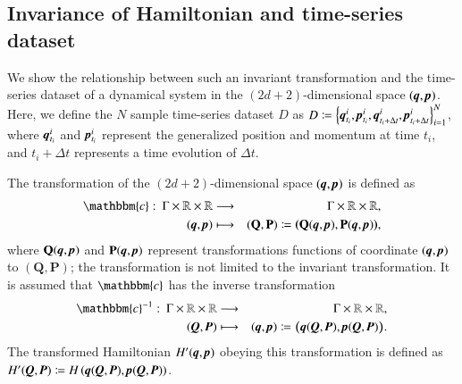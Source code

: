 \documentclass[preprint,
bibnotes,
 amsmath,amssymb,
 aps,
]{revtex4-1}
\begin{document}
\subsection{Invariance of Hamiltonian and time-series dataset}
We show the relationship between such an invariant transformation and 
the time-series dataset of a dynamical system in the $(2d+2)$-dimensional space $(\textit{\textbf{q}},\textit{\textbf{p}})$. 
Here, we define the $N$ sample time-series dataset $D$ as $D \coloneqq \left\{\textit{\textbf{q}}_{t_i}^i, \textit{\textbf{p}}_{t_i}^i,\textit{\textbf{q}}_{t_i+\Delta t}^i, \textit{\textbf{p}}_{t_i+\Delta t}^i\right\}_{i=1}^N$, where $\textit{\textbf{q}}_{t_i}^i$ and  $\textit{\textbf{p}}_{t_i}^i$ represent the generalized position and momentum at time $t_i$, and $t_i + \Delta t$ represents a time evolution of $\Delta t$.\par
The transformation of the $(2d+2)$-dimensional space $(\textit{\textbf{q}},\textit{\textbf{p}})$ is defined as  
\begin{eqnarray}
\label{transeq}
\mathbbm{c}:\: \Gamma \times \mathbb{R} \times \mathbb{R} &\longrightarrow& \Gamma \times \mathbb{R} \times \mathbb{R},\\ 
\:(\textit{\textbf{q}},\textit{\textbf{p}}) &\longmapsto& (\mathbf{Q},\mathbf{P}) \coloneqq \textbf{(}\mathbf{Q}(\textit{\textbf{q}},\textit{\textbf{p}}),\mathbf{P}(\textit{\textbf{q}},\textit{\textbf{p}})\textbf{)},
\end{eqnarray}
where $\mathbf{Q}(\textit{\textbf{q}},\textit{\textbf{p}})$ and $\mathbf{P}(\textit{\textbf{q}},\textit{\textbf{p}})$ represent transformations functions of coordinate $(\textit{\textbf{q}},\textit{\textbf{p}})$ to $(\mathbf{Q},\mathbf{P})$; the transformation is not limited to the invariant transformation. 
It is assumed that $\mathbbm{c}$ has the inverse transformation
\begin{eqnarray}
\mathbbm{c}^{-1}:\: \Gamma \times \mathbb{R} \times \mathbb{R} &\longrightarrow& \Gamma \times \mathbb{R} \times \mathbb{R},\\
\:(\textit{\textbf{Q}},\textit{\textbf{P}}) &\longmapsto& (\textit{\textbf{q}},\textit{\textbf{p}}) \coloneqq \boldsymbol{(}\textit{\textbf{q}}(\textit{\textbf{Q}},\textit{\textbf{P}}),\textit{\textbf{p}}(\textit{\textbf{Q}},\textit{\textbf{P}})\boldsymbol{)}.
\end{eqnarray}
The transformed Hamiltonian $H'(\textit{\textbf{q}},\textit{\textbf{p}})$ obeying this transformation is defined as $H'(\textit{\textbf{Q}},\textit{\textbf{P}}) \coloneqq H\left(\textit{\textbf{q}}(\textit{\textbf{Q}},\textit{\textbf{P}}),\textit{\textbf{p}}(\textit{\textbf{Q}},\textit{\textbf{P}})\right)$. 
\end{document}
